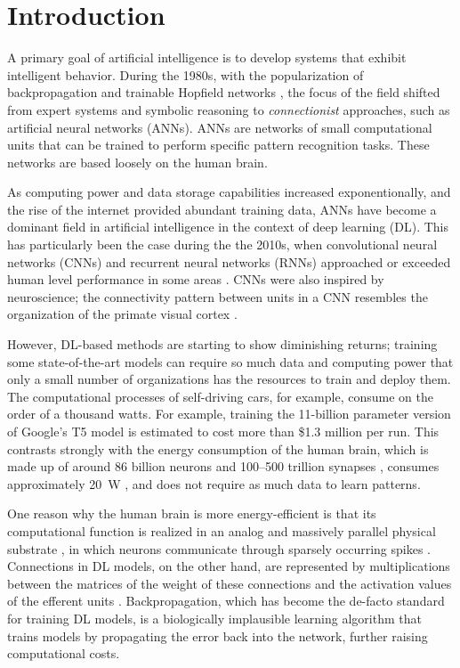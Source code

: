 \chapter{Introduction}\label{ch:introduction}

A primary goal of artificial intelligence is to develop systems that exhibit intelligent behavior.
During the 1980s, with the popularization of backpropagation \citep{rumelhart1986learning} and trainable Hopfield networks \citep{hopfield1982neural}, the focus of the field shifted from expert systems and symbolic reasoning to \emph{connectionist} approaches, such as artificial neural networks (ANNs).
ANNs are networks of small computational units that can be trained to perform specific pattern recognition tasks.
These networks are based loosely on the human brain.

As computing power and data storage capabilities increased exponentionally, and the rise of the internet provided abundant training data, ANNs have become a dominant field in artificial intelligence in the context of deep learning (DL).
This has particularly been the case during the the 2010s, when convolutional neural networks (CNNs) and recurrent neural networks (RNNs) approached or exceeded human level performance in some areas \citep{schmidhuber2015deep}.
CNNs were also inspired by neuroscience; the connectivity pattern between units in a CNN resembles the organization of the primate visual cortex \citep{hubel1968receptive}.

However, DL-based methods are starting to show diminishing returns; training some state-of-the-art models can require so much data and computing power that only a small number of organizations has the resources to train and deploy them.
The computational processes of self-driving cars, for example, consume on the order of a thousand watts.
For example, training the 11-billion parameter version of Google's T5 model \citep{raffel2019exploring} is estimated to cost more than \$1.3 million per run\citep{sharir2020cost}.
This contrasts strongly with the energy consumption of the human brain, which is made up of around 86 billion neurons \citep{azevedo2009equal} and 100--500 trillion synapses \citep{drachman2005we}, consumes approximately \SI{20}{\watt} \citep{sokoloff1960metabolism,drubach2000brain}, and does not require as much data to learn patterns.

One reason why the human brain is more energy-efficient is that its computational function is realized in an analog and massively parallel physical substrate \citep{a2017parallel}, in which neurons communicate through sparsely occurring spikes \citep{bear2020neuroscience}.
Connections in DL models, on the other hand, are represented by multiplications between the matrices of the weight of these connections and the activation values of the efferent units \citep{lecun2015deep}.
Backpropagation, which has become the de-facto standard for training DL models, is a biologically implausible learning algorithm that trains models by propagating the error back into the network, further raising computational costs.

